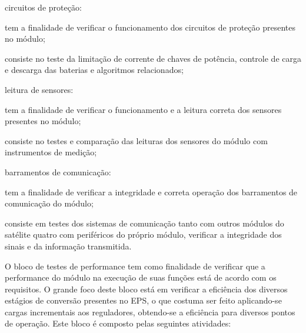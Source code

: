 \begin{alineas}
    \item circuitos de proteção:
    \begin{alineas}
        \item tem a finalidade de verificar o funcionamento dos circuitos de proteção presentes no módulo;
        \item consiste no teste da limitação de corrente de chaves de potência, controle de carga e descarga das baterias e algoritmos relacionados;
    \end{alineas}

    \item leitura de sensores:
    \begin{alineas}
        \item tem a finalidade de verificar o funcionamento e a leitura correta dos sensores presentes no módulo;
        \item consiste no testes e comparação das leituras dos sensores do módulo com instrumentos de medição;
    \end{alineas}

    \item barramentos de comunicação:
    \begin{alineas}
        \item tem a finalidade de verificar a integridade e correta operação dos barramentos de comunicação do módulo;
        \item consiste em testes dos sistemas de comunicação tanto com outros módulos do satélite quatro com periféricos do próprio módulo, verificar a integridade dos sinais e da informação transmitida.
    \end{alineas}
\end{alineas}

O bloco de testes de performance tem como finalidade de verificar que a performance do módulo na execução de suas funções está de acordo com os requisitos.
O grande foco deste bloco está em verificar a eficiência dos diversos estágios de conversão presentes no \gls{EPS}, o que costuma ser feito aplicando-se cargas incrementais aos reguladores, obtendo-se a eficiência para diversos pontos de operação.
Este bloco é composto pelas seguintes atividades:

